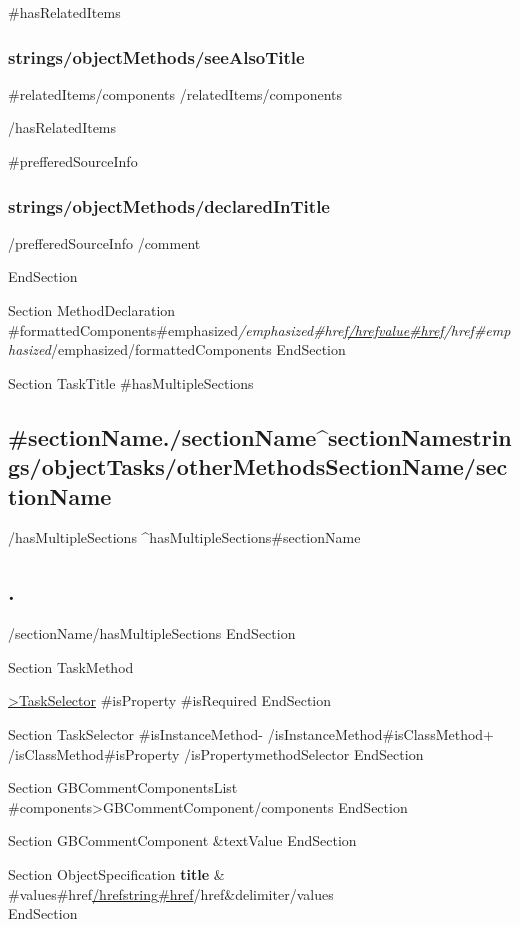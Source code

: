 {{#hasRelatedItems}}
\subsubsection{{{strings/objectMethods/seeAlsoTitle}}}
\begin{list}{}{\leftmargin=.5cm}
	{{#relatedItems/components}}
	\list \hyperlink{//api/name/{{>GBCommentComponent}}}{}
	{{/relatedItems/components}}
\end{list}
{{/hasRelatedItems}}
	
{{#prefferedSourceInfo}}
\subsubsection{{{strings/objectMethods/declaredInTitle}}}
{{/prefferedSourceInfo}}
{{/comment}}

EndSection

Section MethodDeclaration
{{#formattedComponents}}{{#emphasized}}\emph{{{/emphasized}}{{#href}}\hyperlink{{{&href}}}{{{/href}}{{value}}{{#href}}}{{/href}}{{#emphasized}}}{{/emphasized}}{{/formattedComponents}}
EndSection


Section TaskTitle
{{#hasMultipleSections}}\subsection{{{#sectionName}}{{.}}{{/sectionName}}{{^sectionName}}{{strings/objectTasks/otherMethodsSectionName}}{{/sectionName}}}{{/hasMultipleSections}}
{{^hasMultipleSections}}{{#sectionName}}\subsection{{{.}}}{{/sectionName}}{{/hasMultipleSections}}
EndSection

Section TaskMethod
\item \hyperlink{{{htmlReferenceName}}}{{{>TaskSelector}}}
	{{#isProperty}}
	{{#isRequired}}
EndSection

Section TaskSelector
{{#isInstanceMethod}}- {{/isInstanceMethod}}{{#isClassMethod}}+ {{/isClassMethod}}{{#isProperty}}  {{/isProperty}}{{methodSelector}}
EndSection


Section GBCommentComponentsList
{{#components}}{{>GBCommentComponent}}{{/components}}
EndSection

Section GBCommentComponent
{{&textValue}}
EndSection

Section ObjectSpecification
\noalign{\smallskip}
	\textbf{{{title}}} & {{#values}}{{#href}}\href{{{&href}}}{{{/href}}{{string}}{{#href}}}{{/href}}{{&delimiter}}{{/values}} \\
\noalign{\smallskip}
EndSection
